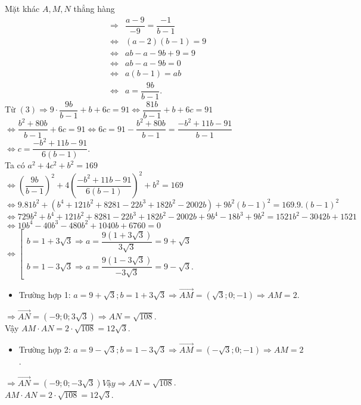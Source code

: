 \begin{ex}
{		Mặt khác $A, M, N$ thẳng hàng 
		\begin{eqnarray*}& \Rightarrow& \dfrac{a-9}{-9}=\dfrac{-1}{b-1}\\
			&\Leftrightarrow&(a-2)(b-1)=9 \\
			& \Leftrightarrow& a b-a-9b+9=9 \\
			& \Leftrightarrow& a b-a-9b=0\\
			& \Leftrightarrow& a(b-1)=a b\\
			& \Leftrightarrow& a=\dfrac{9b}{b-1}.
		\end{eqnarray*}
		Từ $(3) \Rightarrow 9\cdot \dfrac{9b}{b-1}+b+6c=91 \Leftrightarrow \dfrac{81b}{b-1}+b+6c=91$\\
		$\Leftrightarrow \dfrac{b^2+80b}{b-1}+6c=91\Leftrightarrow 6c=91-\dfrac{b^2+80b}{b-1}=\dfrac{-b^2+11b-91}{b-1}$\\
		$\Leftrightarrow c=\dfrac{-b^2+11b-91}{6(b-1)}$.\\
		Ta có $a^2+4c^2+b^2=169$\\
		$\Leftrightarrow\left(\dfrac{9b}{b-1}\right)^2+4\left(\dfrac{-b^2+11b-91}{6(b-1)}\right)^2+b^2=169$\\
		$\Leftrightarrow 9.81b^2+\left(b^4+121b^2+8281-22b^3+182b^2-2002b\right)+9b^2(b-1)^2=169.9.(b-1)^2$\\
		$\Leftrightarrow 729b^2+b^4+121b^2+8281-22b^3+182b^2-2002b+9b^4-18b^3+9b^2=1521b^2-3042b+1521$\\
		$\Leftrightarrow 10b^4-40b^3-480b^2+1040b+6760=0$\\
		$\Leftrightarrow\left[\begin{array}{l}b=1+3\sqrt{3} \Rightarrow a=\dfrac{9(1+3\sqrt{3})}{3\sqrt{3}}=9+\sqrt{3} \\ b=1-3\sqrt{3} \Rightarrow a=\dfrac{9(1-3\sqrt{3})}{-3\sqrt{3}}=9-\sqrt{3}.\end{array}\right.$
		\begin{itemize}
			\item Trường hợp 1: $ a=9+\sqrt{3}; b=1+3\sqrt{3} \Rightarrow \overrightarrow{AM}=(\sqrt{3}; 0;-1) \Rightarrow AM=2$.
		\end{itemize}
		$\Rightarrow \overrightarrow{AN}=(-9; 0; 3\sqrt{3}) \Rightarrow AN=\sqrt{108}$.\\
		Vậy $AM\cdot AN=2\cdot \sqrt{108}=12\sqrt{3}$.
		\begin{itemize}
			\item Trường hợp 2: $a=9-\sqrt{3}; b=1-3\sqrt{3} \Rightarrow \overrightarrow{AM}=(-\sqrt{3}; 0;-1) \Rightarrow AM=2$.
		\end{itemize}
		$\Rightarrow \overrightarrow{AN}=(-9; 0;-3\sqrt{3}) Vậy \Rightarrow AN=\sqrt{108}$.\\
		$AM\cdot AN=2\cdot \sqrt{108}=12\sqrt{3}$.
	}
\end{ex}

